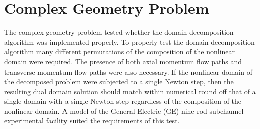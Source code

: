 %
%
%
%
%

\section{Complex Geometry Problem}
\label{sect:complexProblem}
The complex geometry problem tested whether the domain decomposition algorithm was implemented properly.
To properly test the domain decomposition algorithm many different permutations of the composition of the nonlinear domain were required.
The presence of both axial momentum flow paths and transverse momentum flow paths were also necessary.
If the nonlinear domain of the decomposed problem were subjected to a single Newton step, then the resulting dual domain solution should match within numerical round off that of a single domain with a single Newton step regardless of the composition of the nonlinear domain.
A model of the General Electric (GE) nine-rod subchannel experimental facility \cite{Lahey1970} suited the requirements of this test.

